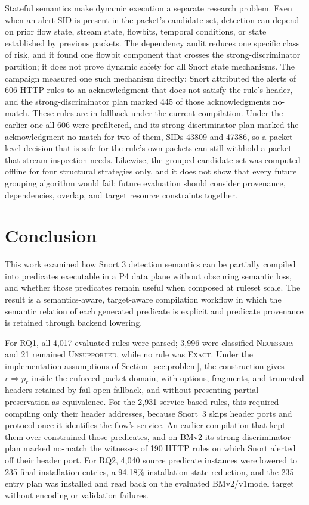 \documentclass{article}
\begin{document}
Stateful semantics make dynamic execution a separate research problem. Even
when an alert SID is present in the packet's candidate set, detection can
depend on prior flow state, stream state, flowbits, temporal conditions, or
state established by previous packets. The dependency audit reduces one
specific class of risk, and it found one flowbit component that crosses the
strong-discriminator partition; it does not prove dynamic safety for all
Snort state mechanisms. The campaign measured one such mechanism directly:
Snort attributed the alerts of 606 HTTP rules to an acknowledgment that does
not satisfy the rule's header, and the strong-discriminator plan marked 445
of those acknowledgments no-match. These rules are in fallback under the
current compilation. Under the earlier one all 606 were prefiltered, and its
strong-discriminator plan marked the acknowledgment no-match for two of
them, SIDs 43809 and 47386, so a packet-level decision that is safe for the rule's own packets can still
withhold a packet that stream inspection needs. Likewise, the grouped
candidate set was computed offline for four structural strategies only, and
it does not show that every future grouping algorithm would fail; future
evaluation should consider provenance, dependencies, overlap, and target
resource constraints together.

\section{Conclusion}
This work examined how Snort 3 detection semantics can be partially compiled
into predicates executable in a P4 data plane without obscuring semantic loss,
and whether those predicates remain useful when composed at ruleset scale. The
result is a semantics-aware, target-aware compilation workflow in which the
semantic relation of each generated predicate is explicit and predicate
provenance is retained through backend lowering.

For RQ1, all 4,017 evaluated rules were parsed; 3,996 were classified
\textsc{Necessary} and 21 remained \textsc{Unsupported}, while no rule was
\textsc{Exact}. Under the implementation assumptions of
Section~\ref{sec:problem}, the construction gives $r \Rightarrow p_r$ inside
the enforced packet domain, with options, fragments, and truncated headers
retained by fail-open fallback, and without presenting partial preservation
as equivalence. For the 2,931 service-based rules, this required compiling
only their header addresses, because Snort~3 skips header ports and protocol
once it identifies the flow's service. An earlier compilation that kept them
over-constrained those predicates, and on BMv2 its strong-discriminator plan
marked no-match the witnesses of 190 HTTP rules on which Snort alerted off
their header port. For RQ2, 4,040 source predicate instances were lowered to
235 final installation entries, a 94.18\% installation-state reduction, and
the 235-entry plan was installed and read back on the evaluated BMv2/v1model
target without encoding or validation failures.
\end{document}
